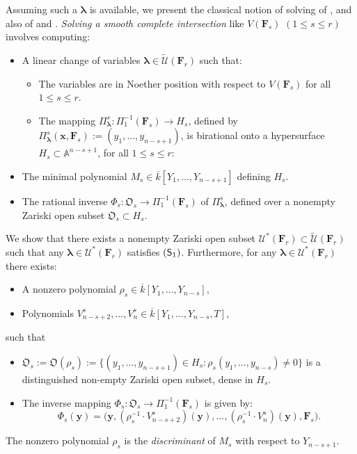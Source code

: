 \documentclass[pdflatex,sn-basic]{sn-jnl}%
\theoremstyle{thmstyleone}%
\theoremstyle{thmstyletwo}%
\theoremstyle{thmstylethree}%
\theoremstyle{definition}
\numberwithin{equation}{section}
\newcommand{\bfs}{\boldsymbol}
\newcommand{\A}{\mathbb A}
\begin{document}
Assuming such a $\bfs\lambda$ is available, we present the classical
notion of solving of \cite{Kronecker82}, and also
of \cite{GiHeMoPa95} and \cite{Pardo95}. {\em Solving a smooth
complete intersection} like $V(\bfs F_s)$ $(1\le s\le r)$ involves
computing:
%
\begin{itemize}
  \item[$({\sf S}_1)$] A linear change
  of variables $\bfs\lambda\in\widetilde{\mathcal{U}}(\bfs F_r)$ such that:
  \begin{itemize}
\item The variables are in
Noether position with respect to $V(\bfs F_s)$ for all $1\le s\le
r$.
%
\item The mapping $\Pi_{\bfs\lambda}^s:\Pi_1^{-1}(\bfs F_s) \to
H_s$, defined by $\Pi_{\bfs\lambda}^s(\bfs x, \bfs F_s):=
(y_1,\ldots,y_{n-s+1})$, is birational onto a hypersurface
$H_s\subset\A^{n-s+1}$, for all $1\le s\le r$:
%
\end{itemize}
%
  \item[$({\sf S}_2)$] The minimal polynomial $M_s\in \overline{k}[Y_1,\ldots,Y_{n-s+1}]$
  defining $H_s$.
  \item[$({\sf S}_3)$] The rational inverse
  $\Phi_s:\mathfrak{O}_s\to \Pi_1^{-1}(\bfs F_s)$
  of $\Pi_{\bfs\lambda}^s$, defined over a
  nonempty Zariski open subset $\mathfrak{O}_s\subset H_s$.
\end{itemize}

We show that there exists a nonempty Zariski open subset
$\mathcal{U}^*(\bfs F_r)\subset \widetilde{\mathcal{U}}(\bfs F_r)$
such that any $\bfs\lambda\in\mathcal{U}^*(\bfs F_r)$ satisfies
$({\sf S}_1)$. Furthermore, for any
$\bfs\lambda\in\mathcal{U}^*(\bfs F_r)$ there exists:
%
\begin{itemize}
  \item A nonzero polynomial
  $\rho_s\in\overline{k}[Y_1,\ldots,Y_{n-s}]$,
  \item Polynomials
$V_{n-s+2}^s,\ldots,V_n^s\in\overline{k}[Y_1,\ldots,Y_{n-s},T]$,
\end{itemize}
%
such that
%
\begin{itemize}
\item $\mathfrak{O}_s:=\mathfrak{O}(\rho_s):=\{(y_1,\ldots,y_{n-s+1})
\in H_s:\rho_s(y_1,\ldots,y_{n-s})\not=0\}$ is a distinguished
non-empty Zariski open subset, dense in $H_s$.
%
\item The inverse mapping $\Phi_s:\mathfrak{O}_s\to \Pi_1^{-1}(\bfs F_s)$
is given by:
%
$$\Phi_s(\bfs y)=\big(\bfs y,(\rho_s^{-1}\cdot V_{n-s+2}^s)(\bfs y),\ldots,
(\rho_s^{-1}\cdot V_n^s)(\bfs y),\bfs F_s\big).$$
%
\end{itemize}
%
The nonzero polynomial $\rho_s$ is the {\em discriminant} of $M_s$
with respect to $Y_{n-s+1}$.
\end{document}
